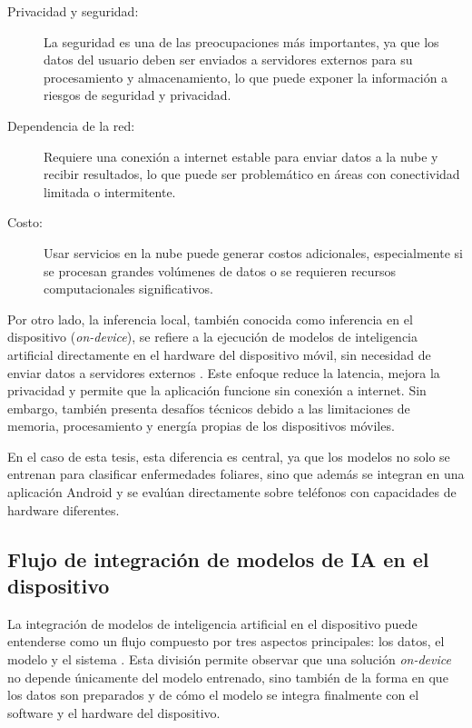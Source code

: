 \begin{description}
    \item[Privacidad y seguridad:] La seguridad es una de las preocupaciones más importantes, ya que los datos del usuario deben ser enviados a
servidores externos para su procesamiento y almacenamiento, lo que puede exponer la información a riesgos de seguridad y privacidad.
    \item[Dependencia de la red:] Requiere una conexión a internet estable para enviar datos a la nube y recibir resultados, lo que puede ser problemático en áreas
     con conectividad limitada o intermitente.
    \item[Costo:] Usar servicios en la nube puede generar costos adicionales, especialmente si se procesan grandes volúmenes de datos o se requieren 
    recursos computacionales significativos.
\end{description}

Por otro lado, la inferencia local, también conocida como inferencia en el dispositivo (\textit{on-device}), se refiere a la ejecución de
modelos de inteligencia artificial directamente en el hardware del dispositivo móvil, sin necesidad de enviar datos a servidores externos
\cite{dhar2019ondevice}. Este enfoque reduce la latencia, mejora la privacidad y permite que la aplicación funcione sin conexión a
internet. Sin embargo, también presenta desafíos técnicos debido a las limitaciones de memoria, procesamiento y energía propias de los
dispositivos móviles.

En el caso de esta tesis, esta diferencia es central, ya que los modelos no solo se entrenan para clasificar enfermedades foliares, sino
que además se integran en una aplicación Android y se evalúan directamente sobre teléfonos con capacidades de hardware diferentes.

\subsection{Flujo de integración de modelos de IA en el dispositivo}

La integración de modelos de inteligencia artificial en el dispositivo puede entenderse como un flujo compuesto por tres aspectos
principales: los datos, el modelo y el sistema \cite{wang2025empowering}. Esta división permite observar que una solución
\textit{on-device} no depende únicamente del modelo entrenado, sino también de la forma en que los datos son preparados y de cómo el
modelo se integra finalmente con el software y el hardware del dispositivo.

